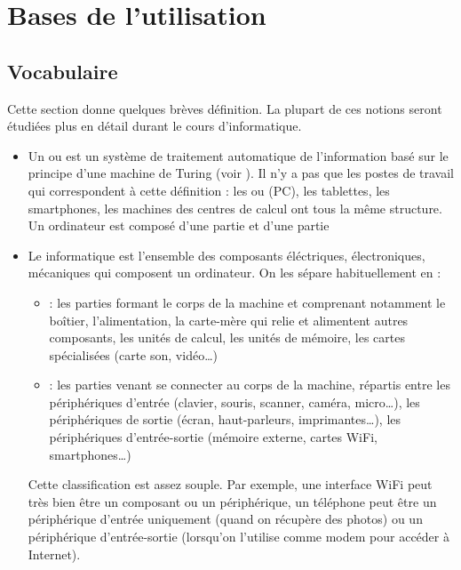 \documentclass[10pt,a4paper]{report}
\begin{document}
\section{Bases de l'utilisation}



\subsection{Vocabulaire}

Cette section donne quelques brèves définition. La plupart de ces notions seront étudiées plus en détail durant le cours d'informatique.

\begin{itemize}
	\item Un  ou  est un système de traitement automatique de l'information basé sur le principe d'une machine de Turing (voir \autocite{MachineTuring2021}). Il n'y a pas que les postes de travail qui correspondent à cette définition : les  ou  (PC), les tablettes, les smartphones, les machines des centres de calcul ont tous la même structure. \\
		Un ordinateur est composé d'une partie  et d'une partie 
	\item Le  informatique est l'ensemble des composants éléctriques, électroniques, mécaniques qui composent un ordinateur. On les sépare habituellement en :
		\begin{itemize}
			\item {} : les parties formant le corps de la machine et comprenant notamment le boîtier, l'alimentation, la carte-mère qui relie et alimentent autres composants, les unités de calcul, les unités de mémoire, les cartes spécialisées (carte son, vidéo\dots)
			\item {} : les parties venant se connecter au corps de la machine, répartis entre les périphériques d'entrée (clavier, souris, scanner, caméra, micro\dots), les périphériques de sortie (écran, haut-parleurs, imprimantes\dots), les périphériques d'entrée-sortie (mémoire externe, cartes WiFi, smartphones\dots)
		\end{itemize}
		Cette classification est assez souple. Par exemple, une interface WiFi peut très bien être un composant ou un périphérique, un téléphone peut être un périphérique d'entrée uniquement (quand on récupère des photos) ou un périphérique d'entrée-sortie (lorsqu'on l'utilise comme modem pour accéder à Internet).
\end{itemize}
\end{document}
